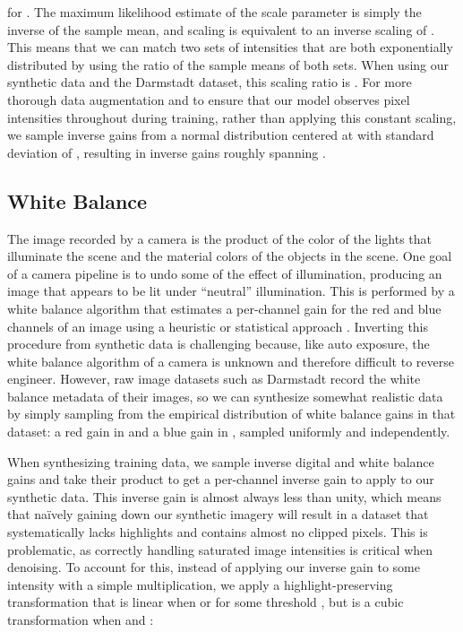 \documentclass[10pt,twocolumn,letterpaper]{article}
\begin{document}
for . The maximum likelihood estimate of the scale parameter  is simply the inverse of the sample mean, and scaling  is equivalent to an inverse scaling of . This means that we can match two sets of intensities that are both exponentially distributed by using the ratio of the sample means of both sets. When using our synthetic data
and the Darmstadt dataset, this scaling ratio is . For more thorough data augmentation and to ensure that our model observes pixel intensities throughout  during training, rather than applying this constant scaling, we sample inverse gains from a normal distribution centered at  with standard deviation of , resulting in inverse gains roughly spanning .

\subsection{White Balance}
\label{sec:wb}

The image recorded by a camera is the product of the color of the lights that illuminate the scene and the material colors of the objects in the scene.
One goal of a camera pipeline is to undo some of the effect of illumination, producing an image that appears to be lit under ``neutral'' illumination.
This is performed by a white balance algorithm that estimates a per-channel gain for the red and blue channels of an image using a heuristic or statistical approach \cite{Gijsenij2011,BarronTsai2017}.
Inverting this procedure from synthetic data is challenging because, like auto exposure, the white balance algorithm of a camera is unknown and therefore difficult to reverse engineer. However, raw image datasets such as Darmstadt record the white balance metadata of their images, so we can synthesize somewhat realistic data by simply sampling from the empirical distribution of white balance gains in that dataset: a red gain in  and a blue gain in , sampled uniformly and independently.

When synthesizing training data, we sample inverse digital and white balance gains and take their product to get a per-channel inverse gain to apply to our synthetic data.
This inverse gain is almost always less than unity, which means that na\"ively gaining down our synthetic imagery will result in a dataset that systematically lacks highlights and contains almost no clipped pixels. This is problematic, as correctly handling saturated image intensities is critical when denoising. To account for this, instead of applying our inverse gain  to some intensity  with a simple multiplication, we apply a highlight-preserving transformation  that is linear when  or  for some threshold , but is a cubic transformation when  and :
\end{document}
